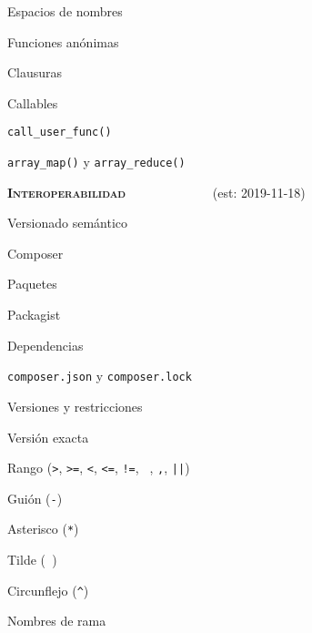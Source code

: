 \begin{longenum}
\begin{longenum}
\begin{longenum}
\begin{longenum}
            \end{longenum}
        \end{longenum}
        \item Espacios de nombres
        \item Funciones anónimas
        \begin{longenum}
            \item Clausuras
        \end{longenum}
        \item Callables
        \begin{longenum}
            \item \texttt{call\_user\_func()}
            \item \texttt{array\_map()} y \texttt{array\_reduce()}
        \end{longenum}
    \end{longenum}
    \item \textbf{\textsc{Interoperabilidad}} \ \ \ \ \ \ \ \ \ \ \ \ \ (est: \mbox{2019-11-18})
    \begin{longenum}
        \item Versionado semántico
        \item Composer
        \begin{longenum}
            \item Paquetes
            \item Packagist
            \item Dependencias
            \begin{longenum}
                \item \texttt{composer.json} y \texttt{composer.lock}
            \end{longenum}
            \item Versiones y restricciones
            \begin{longenum}
                \item Versión exacta
                \item Rango (\texttt{>}, \texttt{>=}, \texttt{<}, \texttt{<=}, \texttt{!=}, \texttt{ }, \texttt{,}, \texttt{||})
                \item Guión (\texttt{-})
                \item Asterisco (\texttt{*})
                \item Tilde (\texttt{~})
                \item Circunflejo (\texttt{\^})
                \item Nombres de rama

\end{longenum}
\end{longenum}
\end{longenum}
\end{longenum}
